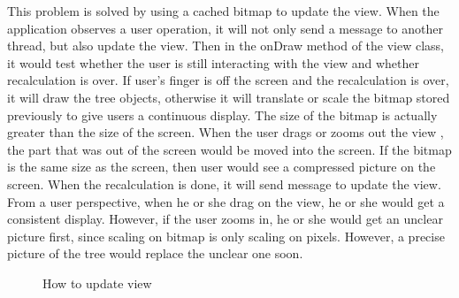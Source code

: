 \documentclass[a4paper,11pt,twoside]{report}
\begin{document}
This problem is solved by using a cached bitmap to update the view. When the application observes a user operation, it will not only send a message to another thread, but also update the view. Then in the onDraw method of the view class, it would test whether the user is still interacting with the view and whether recalculation is over. If user's finger is off the screen and the recalculation is over, it will draw the tree objects, otherwise it will translate or scale the bitmap stored previously to give users a continuous display. The size of the bitmap is actually greater than the size of the screen. When the user drags or zooms out the view , the part that was out of the screen would be moved into the screen. If the bitmap is the same size as the screen, then user would see a compressed picture on the screen. 
When the recalculation is done, it will send message to update the view. From a user perspective, when he or she drag on the view, he or she would get a consistent display. However, if the user zooms in, he or she would get an unclear picture first, since scaling on bitmap is only scaling on pixels. However, a precise picture of the tree would replace the unclear one soon. 

\begin{figure}[H]
\caption{How to update view}
\end{figure}
\end{document}
